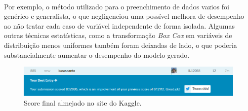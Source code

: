 \documentclass{article}
\begin{document}
	\paragraph{}Por exemplo, o  método utilizado para o preenchimento de dados vazios foi genérico e generalista, o que negligenciou uma possível melhora de desempenho ao não tratar cada caso de variável independente de forma isolada. Algumas outras técnicas estatísticas, como a transformação \textit{Box Cox} em variáveis de distribuição menos uniformes também foram deixadas de lado, o que poderia substancialmente aumentar o desempenho do modelo gerado.
	
	\begin{figure}[H]
		\centering
		\includegraphics[scale=0.6]{../img/final_score}
		\caption{Score final almejado no site do Kaggle.}
	\end{figure}
\end{document}
